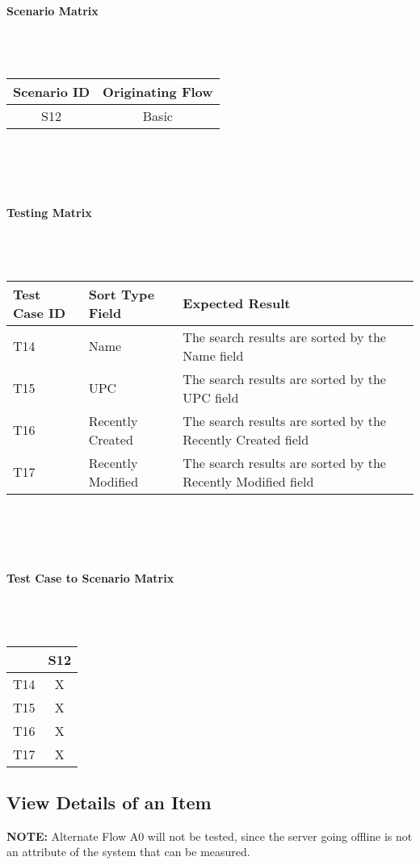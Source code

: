 \documentclass{article}
\begin{document}
\paragraph{Scenario Matrix}~\\ \\
\begin{tabular}{ c  c }
\hline
Scenario ID & Originating Flow\\
\hline
\hline
S12 & Basic\\
\hline
\end{tabular}\\
~\\
~\\
\paragraph{Testing Matrix}~\\ \\
\begin{tabular}{ p{0.8in}  p{1.1in}  p{3.6in} }
\hline
Test Case ID & Sort Type Field & Expected Result\\
\hline
\hline
T14 & Name & The search results are sorted by the Name field\\
\hline
T15 & UPC & The search results are sorted by the UPC field\\
\hline
T16 & Recently Created & The search results are sorted by the Recently Created field\\
\hline
T17 & Recently Modified & The search results are sorted by the Recently Modified field\\
\hline
\end{tabular}\\
~\\
~\\
\paragraph{Test Case to Scenario Matrix}~\\ \\
\begin{tabular}{ | c || c | }
\hline
    & S12 \\
\hline
\hline
T14 &  X  \\
\hline
T15 &  X  \\
\hline
T16 &  X  \\
\hline
T17 &  X  \\
\hline
\end{tabular}

\subsection{View Details of an Item}
\textbf{NOTE:} Alternate Flow A0 will not be tested, since the server going offline is not an attribute of the system that can be measured.
\end{document}
